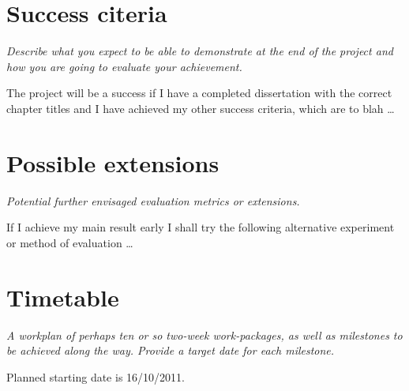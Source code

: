 \documentclass[12pt,a4paper,twoside]{article}
\begin{document}
\section*{Success citeria}

\emph{Describe what you expect to be able to demonstrate at the
end of the project and how you are going to evaluate your achievement.}

The project will be a success if I have a completed dissertation with
the correct chapter titles and I have achieved my other success
criteria, which are to blah \ldots


\section*{Possible extensions}

{\em Potential further envisaged evaluation metrics or extensions.}

If I achieve my main result early I shall try the following
alternative experiment or method of evaluation \ldots


\section*{Timetable}

\emph{A workplan of perhaps ten or so two-week work-packages,
as well as milestones to be achieved along the way. Provide a
target date for each milestone.}

Planned starting date is 16/10/2011.
\end{document}
